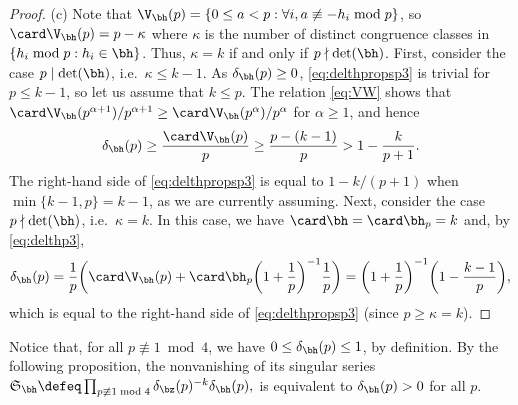 \documentclass[12pt, reqno, twoside, letterpaper]{amsart}
\begin{document}
\begin{proof}
(c) Note that 
$
 \V_{\bh}(p)
  =
   \{0 \le a < p : \forall i, a \not\equiv -h_i \bmod p\} 
$,
so $\card \V_{\bh}(p) = p - \kappa$ where $\kappa$ is the 
number of distinct congruence classes in  
$\{h_i \bmod p : h_i \in \bh\}$.
%
Thus, $\kappa = k$ if and only if $p \nmid \det(\bh)$.
%
First, consider the case $p \mid \det(\bh)$, 
i.e.\ $\kappa \le k - 1$.
%
As $\delta_{\bh}(p) \ge 0$, \eqref{eq:delthpropsp3} is trivial for 
$p \le k - 1$, so let us assume that $k \le p$.
%
The relation \eqref{eq:VW} shows that 
$
 \card \V_{\bh}(p^{\alpha + 1})/p^{\alpha + 1} 
  \ge 
   \card \V_{\bh}(p^{\alpha})/p^{\alpha}
$ 
for $\alpha \ge 1$, and hence 
\[
 \delta_{\bh}(p)
  \ge 
   \frac{\card \V_{\bh}(p)}{p}
    \ge 
     \frac{p - (k - 1)}{p}
       > 
        1 - \frac{k}{p + 1}.
\]
%
The right-hand side of \eqref{eq:delthpropsp3} is equal to 
$1 - k/(p + 1)$ when $\min\{k - 1,p\} = k - 1$, as we are 
currently assuming. 
%
%
Next, consider the case $p \nmid \det(\bh)$, i.e.\ $\kappa = k$.
%
In this case, we have $\card \bh = \card \bh_p = k$ and, by 
\eqref{eq:delthp3},
\[
 \delta_{\bh}(p)
  = 
   \frac{1}{p}
    \bigg(\card \V_{\bh}(p) + \card\bh_p\bigg(1 + \frac{1}{p}\bigg)^{-1}\frac{1}{p} \bigg)
     =
      \bigg(1 + \frac{1}{p}\bigg)^{-1}
       \bigg(1 - \frac{k - 1}{p}\bigg),
\]
which is equal to the right-hand side of \eqref{eq:delthpropsp3} 
(since $p \ge \kappa = k$).
%
\end{proof}

Notice that, for all $p \not\equiv 1 \bmod 4$, we have 
$0 \le \delta_{\bh}(p) \le 1$, by definition.
%
%
By the following proposition,
the nonvanishing of its singular series
$
  \mathfrak{S}_{\bh}
   \defeq 
    \prod_{p \not\equiv 1 \bmod 4}
      \delta_{\bz}(p)^{-k}
       \delta_{\bh}(p),
$
is equivalent to $\delta_{\bh}(p) > 0$ for all $p$.
\end{document}
